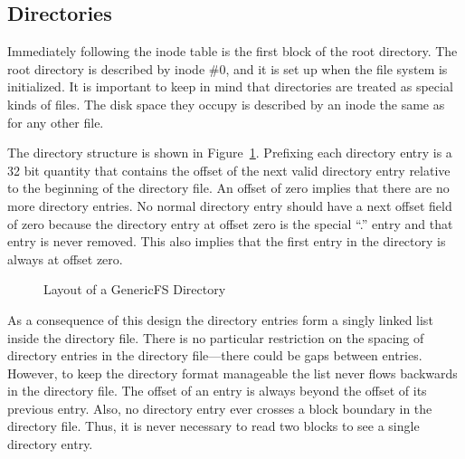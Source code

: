 \subsection{Directories}
\label{sec:structure-directories}

Immediately following the inode table is the first block of the root directory. The root
directory is described by inode \#0, and it is set up when the file system is initialized. It is
important to keep in mind that directories are treated as special kinds of files. The disk space
they occupy is described by an inode the same as for any other file.

The directory structure is shown in Figure~\ref{fig:directory-layout}. Prefixing each directory
entry is a 32 bit quantity that contains the offset of the next valid directory entry relative
to the beginning of the directory file. An offset of zero implies that there are no more
directory entries. No normal directory entry should have a next offset field of zero because the
directory entry at offset zero is the special ``.'' entry and that entry is never removed. This
also implies that the first entry in the directory is always at offset zero.

\begin{figure}[tbhp]
  \center
  \caption{Layout of a GenericFS Directory}
  \label{fig:directory-layout}
\end{figure}

As a consequence of this design the directory entries form a singly linked list inside the
directory file. There is no particular restriction on the spacing of directory entries in the
directory file---there could be gaps between entries. However, to keep the directory format
manageable the list never flows backwards in the directory file. The offset of an entry is
always beyond the offset of its previous entry. Also, no directory entry ever crosses a block
boundary in the directory file. Thus, it is never necessary to read two blocks to see a single
directory entry.


